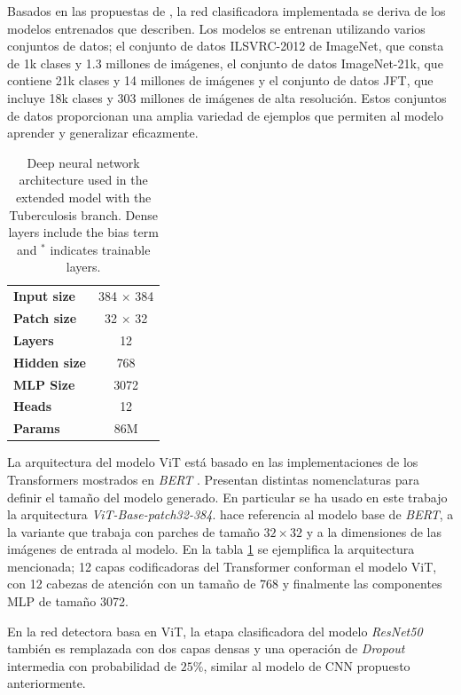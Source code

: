 {Basados en las propuestas de \citeauthor{DBLP:journals/corr/abs-2010-11929}, la red clasificadora
implementada se deriva de los modelos entrenados que describen. Los modelos se entrenan utilizando
varios conjuntos de datos; el conjunto de datos ILSVRC-2012 de ImageNet, que consta de 1k clases y
1.3 millones de imágenes, el conjunto de datos ImageNet-21k, que contiene 21k clases y 14 millones
de imágenes y el conjunto de datos JFT, que incluye 18k clases y 303 millones de imágenes de alta
resolución. Estos conjuntos de datos proporcionan una amplia variedad de ejemplos que permiten al
modelo aprender y generalizar eficazmente.

\begin{table}[!ht]
    \centering
    \begin{tabular}{| l | c |}
     \hline
    \textbf{Input size}  & 384 $\times$ 384 \\
    \textbf{Patch size}  & 32 $\times$ 32 \\
    \textbf{Layers}      & 12  \\
    \textbf{Hidden size} & 768 \\
    \textbf{MLP Size}    & 3072 \\
    \textbf{Heads}       & 12 \\
    \textbf{Params}      & 86M \\
     \hline
    \end{tabular}
    \caption{Deep neural network architecture used in the extended model with the Tuberculosis branch. Dense layers include the bias term and $^\ast$ indicates trainable layers.}
\label{table_ViTBase}
\end{table}

La arquitectura del modelo ViT está basado en las implementaciones de los Transformers
mostrados en \textit{BERT} \cite{DBLP:journals/corr/abs-1810-04805}. Presentan distintas nomenclaturas
para definir el tamaño del modelo generado. En particular se ha usado en este trabajo la arquitectura
\textit{ViT-Base-patch32-384}.  hace referencia al modelo base de
\textit{BERT},  a la variante que trabaja con parches de tamaño $32 \times 32$ y
 a la dimensiones de las imágenes de entrada al modelo. En la tabla \ref{table_ViTBase}
se ejemplifica la arquitectura mencionada; 12 capas codificadoras del Transformer conforman el modelo
ViT, con 12 cabezas de atención con un tamaño de 768 y finalmente las componentes MLP de tamaño 3072.

En la red detectora basa en ViT, la etapa clasificadora del modelo \textit{ResNet50} también es
remplazada con dos capas densas y una operación de \textit{Dropout} intermedia con probabilidad
de $25\%$, similar al modelo de CNN propuesto anteriormente.

}
